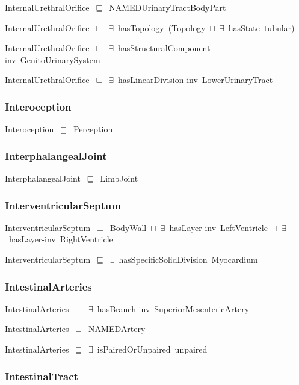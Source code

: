\documentclass{article}
\begin{document}
InternalUrethralOrifice~\ensuremath{\sqsubseteq}~NAMEDUrinaryTractBodyPart~

InternalUrethralOrifice~\ensuremath{\sqsubseteq}~\ensuremath{\exists}~hasTopology~(Topology~\ensuremath{\sqcap}~\ensuremath{\exists}~hasState~tubular)~

InternalUrethralOrifice~\ensuremath{\sqsubseteq}~\ensuremath{\exists}~hasStructuralComponent-inv~GenitoUrinarySystem~

InternalUrethralOrifice~\ensuremath{\sqsubseteq}~\ensuremath{\exists}~hasLinearDivision-inv~LowerUrinaryTract~

\subsubsection*{Interoception}

Interoception~\ensuremath{\sqsubseteq}~Perception~

\subsubsection*{InterphalangealJoint}

InterphalangealJoint~\ensuremath{\sqsubseteq}~LimbJoint~

\subsubsection*{InterventricularSeptum}

InterventricularSeptum~\ensuremath{\equiv}~BodyWall~\ensuremath{\sqcap}~\ensuremath{\exists}~hasLayer-inv~LeftVentricle~\ensuremath{\sqcap}~\ensuremath{\exists}~hasLayer-inv~RightVentricle

InterventricularSeptum~\ensuremath{\sqsubseteq}~\ensuremath{\exists}~hasSpecificSolidDivision~Myocardium~

\subsubsection*{IntestinalArteries}

IntestinalArteries~\ensuremath{\sqsubseteq}~\ensuremath{\exists}~hasBranch-inv~SuperiorMesentericArtery~

IntestinalArteries~\ensuremath{\sqsubseteq}~NAMEDArtery~

IntestinalArteries~\ensuremath{\sqsubseteq}~\ensuremath{\exists}~isPairedOrUnpaired~unpaired~

\subsubsection*{IntestinalTract}
\end{document}
